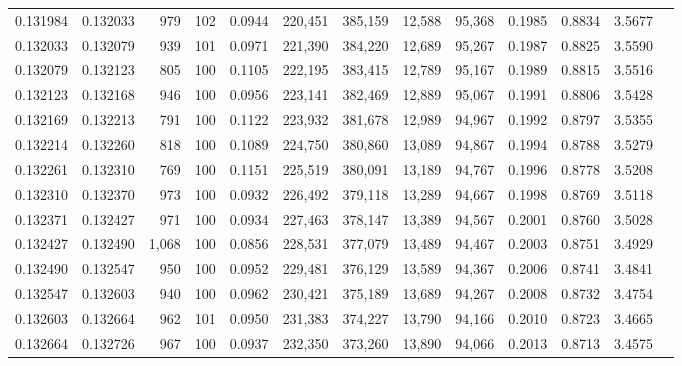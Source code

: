\begin{tabular}{rrrrrrrrrrrrr}
0.131984 & 0.132033 &   979 & 102 &                                     0.0944 & 220,451 & 385,159 &  12,588 &  95,368 & 0.1985 & 0.8834 & 3.5677 \\
0.132033 & 0.132079 &   939 & 101 &                                     0.0971 & 221,390 & 384,220 &  12,689 &  95,267 & 0.1987 & 0.8825 & 3.5590 \\
0.132079 & 0.132123 &   805 & 100 &                                     0.1105 & 222,195 & 383,415 &  12,789 &  95,167 & 0.1989 & 0.8815 & 3.5516 \\
0.132123 & 0.132168 &   946 & 100 &                                     0.0956 & 223,141 & 382,469 &  12,889 &  95,067 & 0.1991 & 0.8806 & 3.5428 \\
0.132169 & 0.132213 &   791 & 100 &                                     0.1122 & 223,932 & 381,678 &  12,989 &  94,967 & 0.1992 & 0.8797 & 3.5355 \\
0.132214 & 0.132260 &   818 & 100 &                                     0.1089 & 224,750 & 380,860 &  13,089 &  94,867 & 0.1994 & 0.8788 & 3.5279 \\
0.132261 & 0.132310 &   769 & 100 &                                     0.1151 & 225,519 & 380,091 &  13,189 &  94,767 & 0.1996 & 0.8778 & 3.5208 \\
0.132310 & 0.132370 &   973 & 100 &                                     0.0932 & 226,492 & 379,118 &  13,289 &  94,667 & 0.1998 & 0.8769 & 3.5118 \\
0.132371 & 0.132427 &   971 & 100 &                                     0.0934 & 227,463 & 378,147 &  13,389 &  94,567 & 0.2001 & 0.8760 & 3.5028 \\
0.132427 & 0.132490 & 1,068 & 100 &                                     0.0856 & 228,531 & 377,079 &  13,489 &  94,467 & 0.2003 & 0.8751 & 3.4929 \\
0.132490 & 0.132547 &   950 & 100 &                                     0.0952 & 229,481 & 376,129 &  13,589 &  94,367 & 0.2006 & 0.8741 & 3.4841 \\
0.132547 & 0.132603 &   940 & 100 &                                     0.0962 & 230,421 & 375,189 &  13,689 &  94,267 & 0.2008 & 0.8732 & 3.4754 \\
0.132603 & 0.132664 &   962 & 101 &                                     0.0950 & 231,383 & 374,227 &  13,790 &  94,166 & 0.2010 & 0.8723 & 3.4665 \\
0.132664 & 0.132726 &   967 & 100 &                                     0.0937 & 232,350 & 373,260 &  13,890 &  94,066 & 0.2013 & 0.8713 & 3.4575 \\

\end{tabular}
